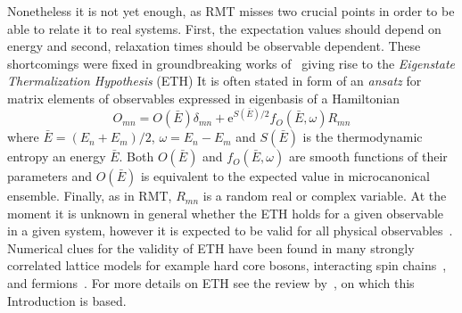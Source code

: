 Nonetheless it is not yet enough, as RMT misses two crucial points in order to be able to relate
it to real systems. First, the expectation values should depend on energy and second, relaxation
times should be observable dependent. These shortcomings were fixed in groundbreaking works
of~\textcite{Deutsch19912046,Srednicki1994} giving rise to the \textit{Eigenstate Thermalization Hypothesis} (ETH)
It is often stated in form of an \textit{ansatz} for matrix elements of observables expressed in
eigenbasis of a Hamiltonian~\autocite{Srednicki1999}
\begin{equation}
    O_{mn} = O(\bar{E}) \delta_{mn} + \mathrm{e}^{S(\bar{E})/2}f_{O}(\bar{E},\omega)R_{mn}
    \label{eq:ETH}
\end{equation}
where \(\bar{E} = (E_n+E_m)/2\), \(\omega=E_n-E_m\) and \(S(\bar{E})\) is the thermodynamic
entropy an energy \(\bar{E}\). Both \(O(\bar{E})\) and \(f_{O}(\bar{E},\omega)\) are smooth
functions of their parameters and \(O(\bar{E})\) is equivalent to the expected value in microcanonical
ensemble. Finally, as in RMT, \(R_{mn}\) is a random real or complex variable. At the moment it is
unknown in general whether the ETH holds for a given observable in a given system,
however it is expected to be valid for all physical observables~\autocite{DAlessio2016}. 
Numerical clues for the validity of ETH have been found in many strongly correlated lattice models
for example hard core bosons, interacting spin chains~\autocite{Santos2010,Rigol2010,Khatami2013,Rigol2009a},
and fermions~\autocite{Neuenhahn2012,Rigol2009}. For more details on ETH see
the review by~\textcite{DAlessio2016}, on which this Introduction is based.


